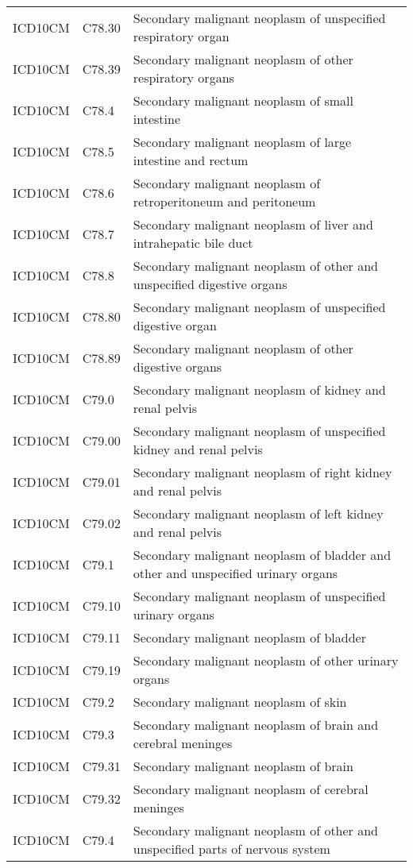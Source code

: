 \begin{longtable}{p{}p{}p{}}
  ICD10CM & C78.30 & Secondary malignant neoplasm of unspecified respiratory organ \\ 
  ICD10CM & C78.39 & Secondary malignant neoplasm of other respiratory organs \\ 
  ICD10CM & C78.4 & Secondary malignant neoplasm of small intestine \\ 
  ICD10CM & C78.5 & Secondary malignant neoplasm of large intestine and rectum \\ 
  ICD10CM & C78.6 & Secondary malignant neoplasm of retroperitoneum and peritoneum \\ 
  ICD10CM & C78.7 & Secondary malignant neoplasm of liver and intrahepatic bile duct \\ 
  ICD10CM & C78.8 & Secondary malignant neoplasm of other and unspecified digestive organs \\ 
  ICD10CM & C78.80 & Secondary malignant neoplasm of unspecified digestive organ \\ 
  ICD10CM & C78.89 & Secondary malignant neoplasm of other digestive organs \\ 
  ICD10CM & C79.0 & Secondary malignant neoplasm of kidney and renal pelvis \\ 
  ICD10CM & C79.00 & Secondary malignant neoplasm of unspecified kidney and renal pelvis \\ 
  ICD10CM & C79.01 & Secondary malignant neoplasm of right kidney and renal pelvis \\ 
  ICD10CM & C79.02 & Secondary malignant neoplasm of left kidney and renal pelvis \\ 
  ICD10CM & C79.1 & Secondary malignant neoplasm of bladder and other and unspecified urinary organs \\ 
  ICD10CM & C79.10 & Secondary malignant neoplasm of unspecified urinary organs \\ 
  ICD10CM & C79.11 & Secondary malignant neoplasm of bladder \\ 
  ICD10CM & C79.19 & Secondary malignant neoplasm of other urinary organs \\ 
  ICD10CM & C79.2 & Secondary malignant neoplasm of skin \\ 
  ICD10CM & C79.3 & Secondary malignant neoplasm of brain and cerebral meninges \\ 
  ICD10CM & C79.31 & Secondary malignant neoplasm of brain \\ 
  ICD10CM & C79.32 & Secondary malignant neoplasm of cerebral meninges \\ 
  ICD10CM & C79.4 & Secondary malignant neoplasm of other and unspecified parts of nervous system \\ 

\end{longtable}
